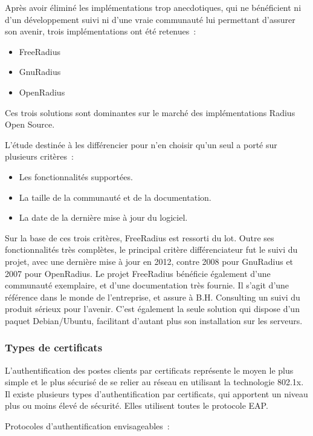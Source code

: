 Après avoir éliminé les implémentations trop anecdotiques, qui ne bénéficient ni d'un développement suivi ni d'une vraie communauté lui permettant d'assurer son avenir, trois implémentations ont été retenues~:

\begin{itemize}
\item FreeRadius
\item GnuRadius
\item OpenRadius
\end{itemize}

Ces trois solutions sont dominantes sur le marché des implémentations Radius Open Source.

L'étude destinée à les différencier pour n'en choisir qu'un seul a porté sur plusieurs critères~:

\begin{itemize}
\item Les fonctionnalités supportées.
\item La taille de la communauté et de la documentation.
\item La date de la dernière mise à jour du logiciel.
\end{itemize}

Sur la base de ces trois critères, FreeRadius est ressorti du lot. Outre ses fonctionnalités très complètes, le principal critère différenciateur fut le suivi du projet, avec une dernière mise à jour en 2012, contre 2008 pour GnuRadius et 2007 pour OpenRadius. Le projet FreeRadius bénéficie également d'une communauté exemplaire, et d'une documentation très fournie. Il s'agit d'une référence dans le monde de l'entreprise, et assure à B.H. Consulting un suivi du produit sérieux pour l'avenir. C'est également la seule solution qui dispose d'un paquet Debian/Ubuntu, facilitant d'autant plus son installation sur les serveurs.

\subsubsection{Types de certificats}

L'authentification des postes clients par certificats représente le moyen le plus simple et le plus sécurisé de se relier au réseau en utilisant la technologie 802.1x. Il existe plusieurs types d'authentification par certificats, qui apportent un niveau plus ou moins élevé de sécurité. Elles utilisent toutes le protocole EAP.

Protocoles d'authentification envisageables~:


